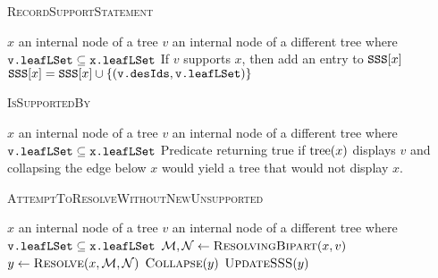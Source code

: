 \documentclass[11pt]{article}
\begin{document}
\begin{algorithm} \caption{\textsc{RecordSupportStatement}}\label{AlgRecordSupportStatement}
\begin{algorithmic}
\REQUIRE $x$ an internal node of a tree
\REQUIRE $v$ an internal node of a different tree where $\texttt{{v}.leafLSet} \subseteq \texttt{{x}.leafLSet}$
\ENSURE If $v$ supports $x$, then add an entry to $\mbox{\texttt{SSS}}[x]$
    $\mbox{\texttt{SSS}}[x] = \mbox{\texttt{SSS}}[x] \cup \{(\texttt{{v}.desIds}, \texttt{{v}.leafLSet})\}$
\ENDIF
\end{algorithmic}
\end{algorithm}

\begin{algorithm} \caption{\textsc{IsSupportedBy}}\label{AlgIsSupportedBy}
\begin{algorithmic}
\REQUIRE $x$ an internal node of a tree
\REQUIRE $v$ an internal node of a different tree where $\texttt{{v}.leafLSet} \subseteq \texttt{{x}.leafLSet}$
\ENSURE Predicate returning true if $\mbox{tree}(x)$ displays $v$ and collapsing the 
    edge below $x$ would yield a tree that would not display $x$.
    \RETURN \FALSE {}
\ENDIF
{}
    \RETURN \FALSE {}
\ENDIF
{}
        \RETURN \FALSE {}
    \ENDIF
\ENDFOR
\RETURN \TRUE
\end{algorithmic}
\end{algorithm}


\begin{algorithm} \caption{\textsc{AttemptToResolveWithoutNewUnsupported}}\label{AlgAttemptToResolveWithoutNewUnsupported}
\begin{algorithmic}
\REQUIRE $x$ an internal node of a tree
\REQUIRE $v$ an internal node of a different tree where $\texttt{{v}.leafLSet} \subseteq \texttt{{x}.leafLSet}$
    \RETURN \FALSE
\ENDIF
\STATE $\mathcal{M}, \mathcal{N} \leftarrow \textsc{ResolvingBipart}(x, v)$
    \RETURN \FALSE
\ENDIF
\STATE $y\leftarrow \textsc{Resolve}(x, \mathcal{M}, \mathcal{N})$
    \STATE $\textsc{Collapse}(y)$
    \RETURN \FALSE
\ELSE
    \STATE $\textsc{UpdateSSS}(y)$
    \RETURN \TRUE
\ENDIF
\end{algorithmic}
\end{algorithm}
\end{document}
